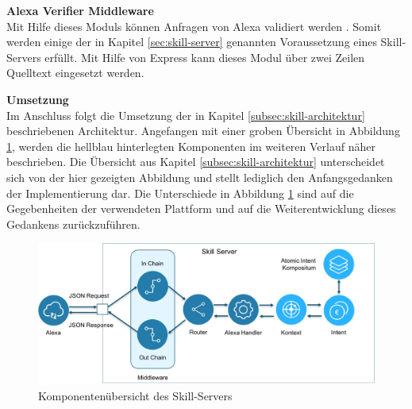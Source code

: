 \textbf{Alexa Verifier Middleware}\\
Mit Hilfe dieses Moduls können Anfragen von Alexa validiert werden \cite{alexa-verify-request}. Somit werden einige der in Kapitel \ref{sec:skill-server} genannten Voraussetzung eines Skill-Servers erfüllt. Mit Hilfe von Express kann dieses Modul über zwei Zeilen Quelltext eingesetzt werden. 

\textbf{Umsetzung}\\
Im Anschluss folgt die Umsetzung der in Kapitel \ref{subsec:skill-architektur} beschriebenen Architektur. Angefangen mit einer groben Übersicht in Abbildung \ref{fig:skill-komponenten}, werden die hellblau hinterlegten Komponenten im weiteren Verlauf näher beschrieben. Die Übersicht aus Kapitel \ref{subsec:skill-architektur} unterscheidet sich von der hier gezeigten Abbildung und stellt lediglich den Anfangsgedanken der Implementierung dar. Die Unterschiede in Abbildung \ref{fig:skill-komponenten} sind auf die Gegebenheiten der verwendeten Plattform und auf die Weiterentwicklung dieses Gedankens zurückzuführen.

\begin{figure}[!htb]
    \centering
    \includegraphics[width=1.0\textwidth]{bilder/4_skillKomponenten.png}
    \caption{Komponentenübersicht des Skill-Servers}
    \label{fig:skill-komponenten}
\end{figure}

